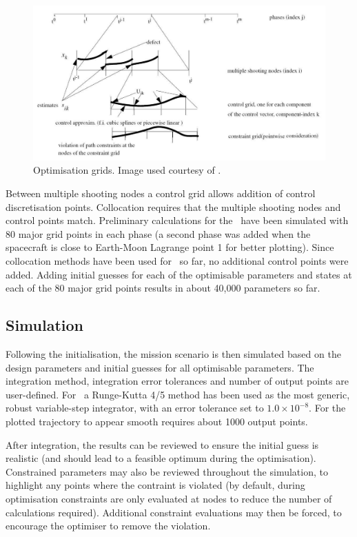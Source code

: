 \begin{figure}
\begin{center}
\includegraphics[width=\textwidth]{Images/control_nodes.pdf}
\end{center}
\caption{Optimisation grids. Image used courtesy of \textcite{ASTOS_guide}.}
\label{fig:Optimisation-grids}
\end{figure}

Between multiple shooting nodes a control grid allows addition of control discretisation points. Collocation requires that the multiple shooting nodes and control points match. Preliminary calculations for the \BW\ have been simulated with 80 major grid points in each phase (a second phase was added when the spacecraft is close to Earth-Moon Lagrange point 1 for better plotting). Since collocation methods have been used for \BW\ so far, no additional control points were added. Adding initial guesses for each of the optimisable parameters and states at each of the 80 major grid points results in about 40,000 parameters so far.

\subsection{Simulation} \label{sub:ASTOS-Simulation}

Following the initialisation, the mission scenario is then simulated based on the design parameters and initial guesses for all optimisable parameters. The integration method, integration error tolerances and number of output points are user-defined. For \BW\ a Runge-Kutta 4/5 method has been used as the most generic, robust variable-step integrator, with an error tolerance set to $1.0\times10^{-8}$. For the plotted trajectory to appear smooth requires about 1000 output
 points.

After integration, the results can be reviewed to ensure the initial guess is realistic (and should lead to a feasible optimum during the optimisation). Constrained parameters may also be reviewed throughout the simulation, to highlight any points where the contraint is violated (by default, during optimisation constraints are only evaluated at nodes to reduce the number of calculations required). Additional constraint evaluations may then be forced, to encourage the optimiser to remove the violation.

